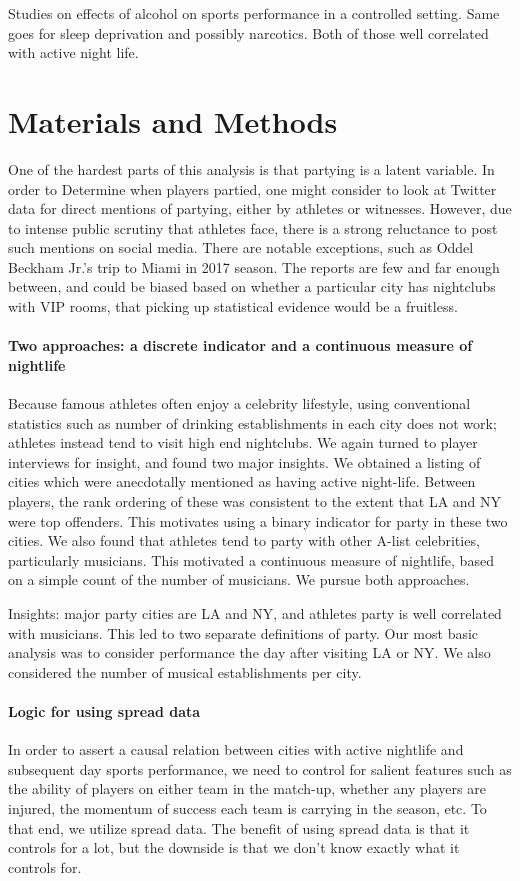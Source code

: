 \documentclass[letterpaper,12pt]{article}
\begin{document}
Studies on effects of alcohol on sports performance in a controlled setting.
Same goes for sleep deprivation and possibly narcotics. 
Both of those well correlated with active night life.

\section{Materials and Methods}
One of the hardest parts of this analysis is that partying is a latent variable.
In order to Determine when players partied, one might consider to look at Twitter data
for direct mentions of partying, either by athletes or witnesses. However, due to
intense public scrutiny that athletes face, there is a strong reluctance to post
such mentions on social media. There are notable exceptions, such
as Oddel Beckham Jr.'s trip to Miami in 2017 season.\cite{bleler}
The reports are few and far enough between,
and could be biased based on whether a particular city has nightclubs with VIP rooms,
that picking up statistical evidence would be a fruitless.

\paragraph{Two approaches: a discrete indicator and a continuous measure of nightlife}
Because famous athletes often enjoy a celebrity lifestyle, using conventional statistics
such as number of drinking establishments in each city does not work; athletes instead
tend to visit high end nightclubs. We again turned to player interviews for insight,
and found two major insights. We obtained a listing of cities which were anecdotally
mentioned as having active night-life. Between players, the rank ordering of these
was consistent to the extent that LA and NY were top
offenders. This motivates using a binary indicator for party in these two cities. 
We also found that athletes tend to party with other A-list celebrities,
particularly musicians. This motivated a continuous measure of nightlife, based on a
simple count of the number of musicians. We pursue both approaches.


Insights: major party cities are LA and NY, and athletes party is well correlated with musicians. This led to two separate definitions of party. Our most basic analysis was to consider performance 
the day after visiting LA or NY.
We also considered the number of musical establishments per city. 

\paragraph{Logic for using spread data}
In order to assert a causal relation between cities with active nightlife 
and subsequent day sports performance, we need to control for salient
features such as the ability of players on either team in the match-up,
whether any players are injured, the momentum of success each team is carrying
in the season, etc. To that end, we utilize spread data. The benefit of
using spread data is that it controls for a lot, but the downside is that
we don't know exactly what it controls for. 
\end{document}
